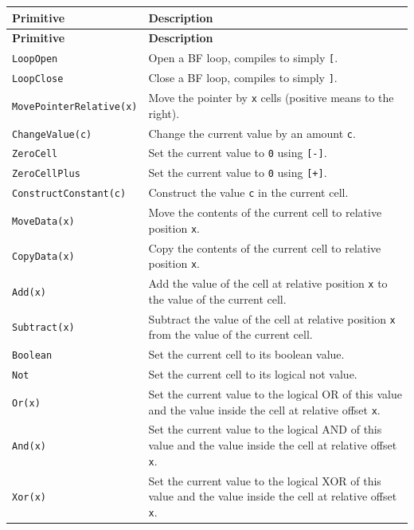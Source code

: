 \begin{longtable}{T{0.30\textwidth}|L{0.62\textwidth}}
  \hline
  \normalfont\textbf{Primitive} & \textbf{Description} \\
  \hline
  \endfirsthead
  \hline
  \normalfont\textbf{Primitive} & \textbf{Description} \\
  \hline
  \endhead

  \texttt{LoopOpen} & Open a BF loop, compiles to simply \texttt{[}. \\
  \texttt{LoopClose} & Close a BF loop, compiles to simply \texttt{]}. \\
  \texttt{MovePointerRelative(x)} & Move the pointer by \texttt{x} cells (positive means to the right). \\
  \texttt{ChangeValue(c)} & Change the current value by an amount \texttt{c}. \\
  \texttt{ZeroCell} & Set the current value to \texttt{0} using \texttt{[-]}. \\
  \texttt{ZeroCellPlus} & Set the current value to \texttt{0} using \texttt{[+]}. \\
  \texttt{ConstructConstant(c)} & Construct the value \texttt{c} in the current cell. \\
  \texttt{MoveData(x)} & Move the contents of the current cell to relative position \texttt{x}. \\
  \texttt{CopyData(x)} & Copy the contents of the current cell to relative position \texttt{x}. \\
  \texttt{Add(x)} & Add the value of the cell at relative position \texttt{x} to the value of the current cell. \\
  \texttt{Subtract(x)} & Subtract the value of the cell at relative position \texttt{x} from the value of the current cell. \\
  \texttt{Boolean} & Set the current cell to its boolean value. \\
  \texttt{Not} & Set the current cell to its logical not value. \\
  \texttt{Or(x)} & Set the current value to the logical OR of this value and the value inside the cell at relative offset \texttt{x}. \\
  \texttt{And(x)} & Set the current value to the logical AND of this value and the value inside the cell at relative offset \texttt{x}. \\
  \texttt{Xor(x)} & Set the current value to the logical XOR of this value and the value inside the cell at relative offset \texttt{x}. \\

\end{longtable}
